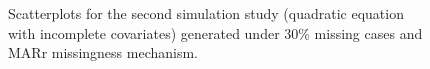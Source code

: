 \begin{figure}
\begin{center}
{{				}
			}
		\end{center}
		\caption{Scatterplots for the second simulation study (quadratic equation with incomplete covariates) generated under 30\% missing cases and MARr missingness mechanism.}
		\label{fig6_7}
	\end{figure}

